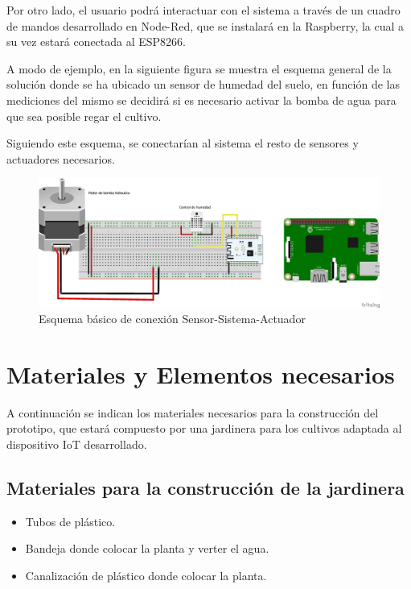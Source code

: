 \documentclass[12pt,a4paper,titlepage,oneside]{report}
\begin{document}
	Por otro lado, el usuario podrá interactuar con el sistema a través de un cuadro de mandos desarrollado en Node-Red, que se instalará en la Raspberry, la cual a su vez estará conectada al ESP8266. \cite{ruiz}
	
	A modo de ejemplo, en la siguiente figura se muestra el esquema general de la solución donde se ha ubicado un sensor de humedad del suelo, en función de las mediciones del mismo se decidirá si es necesario activar la bomba de agua para que sea posible regar el cultivo.

Siguiendo este esquema, se conectarían al sistema el resto de sensores y actuadores necesarios.
	
	\begin{figure}
		\center
		\includegraphics[scale=0.5]{./images/Conexion.png}
		\caption{Esquema básico de conexión Sensor-Sistema-Actuador}
		\label{Esquema_basico}
	\end{figure}		
	
	
	\section{Materiales y Elementos necesarios}
	A continuación se indican los materiales necesarios para la construcción del prototipo, que estará compuesto por una jardinera para los cultivos adaptada al dispositivo IoT desarrollado.\cite{2014}

	\subsection*{Materiales para la construcción de la jardinera}

		\begin{itemize}
			\item Tubos de plástico.
			\item Bandeja donde colocar la planta y verter el agua.
			\item Canalización de plástico donde colocar la planta.
		\end{itemize}			
	
\end{document}
